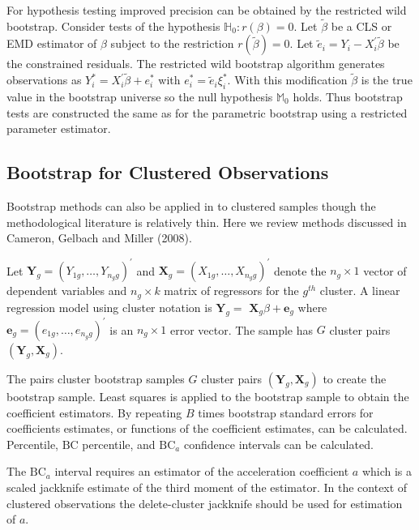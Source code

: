 \documentclass[10pt]{article}
\begin{document}
For hypothesis testing improved precision can be obtained by the restricted wild bootstrap. Consider tests of the hypothesis $\mathbb{H}_{0}: r(\beta)=0$. Let $\widetilde{\beta}$ be a CLS or EMD estimator of $\beta$ subject to the restriction $r(\widetilde{\beta})=0$. Let $\widetilde{e}_{i}=Y_{i}-X_{i}^{\prime} \widetilde{\beta}$ be the constrained residuals. The restricted wild bootstrap algorithm generates observations as $Y_{i}^{*}=X_{i}^{\prime} \widetilde{\beta}+e_{i}^{*}$ with $e_{i}^{*}=\widetilde{e}_{i} \xi_{i}^{*}$. With this modification $\widetilde{\beta}$ is the true value in the bootstrap universe so the null hypothesis $\mathbb{M}_{0}$ holds. Thus bootstrap tests are constructed the same as for the parametric bootstrap using a restricted parameter estimator.

\subsection{Bootstrap for Clustered Observations}
Bootstrap methods can also be applied in to clustered samples though the methodological literature is relatively thin. Here we review methods discussed in Cameron, Gelbach and Miller (2008).

Let $\boldsymbol{Y}_{g}=\left(Y_{1 g}, \ldots, Y_{n_{g} g}\right)^{\prime}$ and $\boldsymbol{X}_{g}=\left(X_{1 g}, \ldots, X_{n_{g} g}\right)^{\prime}$ denote the $n_{g} \times 1$ vector of dependent variables and $n_{g} \times k$ matrix of regressors for the $g^{t h}$ cluster. A linear regression model using cluster notation is $\boldsymbol{Y}_{g}=$ $\boldsymbol{X}_{g} \beta+\boldsymbol{e}_{g}$ where $\boldsymbol{e}_{g}=\left(e_{1 g}, \ldots, e_{n_{g} g}\right)^{\prime}$ is an $n_{g} \times 1$ error vector. The sample has $G$ cluster pairs $\left(\boldsymbol{Y}_{g}, \boldsymbol{X}_{g}\right)$.

The pairs cluster bootstrap samples $G$ cluster pairs $\left(\boldsymbol{Y}_{g}, \boldsymbol{X}_{g}\right)$ to create the bootstrap sample. Least squares is applied to the bootstrap sample to obtain the coefficient estimators. By repeating $B$ times bootstrap standard errors for coefficients estimates, or functions of the coefficient estimates, can be calculated. Percentile, $\mathrm{BC}$ percentile, and $\mathrm{BC}_{a}$ confidence intervals can be calculated.

The $\mathrm{BC}_{a}$ interval requires an estimator of the acceleration coefficient $a$ which is a scaled jackknife estimate of the third moment of the estimator. In the context of clustered observations the delete-cluster jackknife should be used for estimation of $a$.
\end{document}
